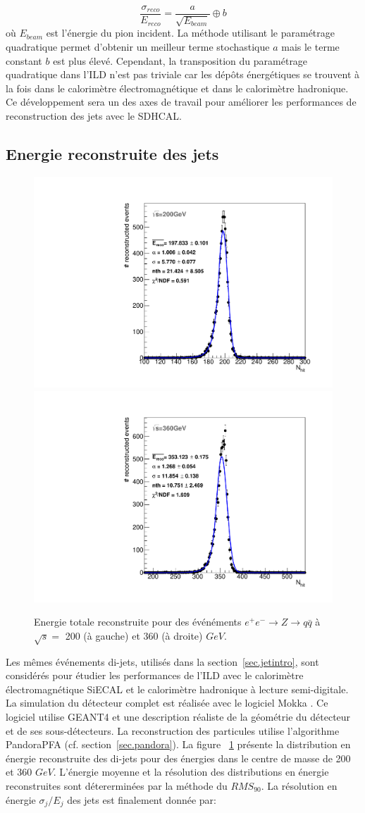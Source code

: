\begin{equation}
  \frac{\sigma_{reco}}{E_{reco}}=\frac{a}{\sqrt{E_{beam}}} \oplus b
\end{equation}
où $E_{beam}$ est l'énergie du pion incident. La méthode utilisant le paramétrage quadratique permet d'obtenir un meilleur terme stochastique $a$ mais le terme constant $b$ est plus élevé. Cependant, la transposition du paramétrage quadratique dans l'ILD n'est pas triviale car les dépôts énergétiques se trouvent à la fois dans le calorimètre électromagnétique et dans le calorimètre hadronique. Ce développement sera un des axes de travail pour améliorer les performances de reconstruction des jets avec le SDHCAL.

\subsection{Energie reconstruite des jets}
\begin{figure}[!ht]
  \includegraphics[width=.49\textwidth]{ILD/figs/erec_200GeV_fPFA.pdf}
  \includegraphics[width=.49\textwidth]{ILD/figs/erec_360GeV_fPFA.pdf}
  \caption{Energie totale reconstruite pour des événéments $e^+e^-\rightarrow Z \rightarrow q\bar{q}$ à $\sqrt{s}=$ 200 (à gauche) et 360 (à droite) $GeV$.}
  \label{fig:jet-energy}
\end{figure}
Les mêmes événements di-jets, utilisés dans la section~\ref{sec.jetintro}, sont considérés pour étudier les performances de l'ILD avec le calorimètre électromagnétique SiECAL et le calorimètre hadronique à lecture semi-digitale. La simulation du détecteur complet est réalisée avec le logiciel Mokka \cite{mokka}. Ce logiciel utilise GEANT4 et une description réaliste de la géométrie du détecteur et de ses sous-détecteurs. La reconstruction des particules utilise l'algorithme PandoraPFA (cf. section~\ref{sec.pandora}). La figure ~\ref{fig:jet-energy} présente la distribution en énergie reconstruite des di-jets pour des énergies dans le centre de masse de 200 et 360 $GeV$. L'énergie moyenne et la résolution des distributions en énergie reconstruites sont détererminées par la méthode du $RMS_{90}$. La résolution en énergie $\sigma_j/E_j$ des jets est finalement donnée par:
